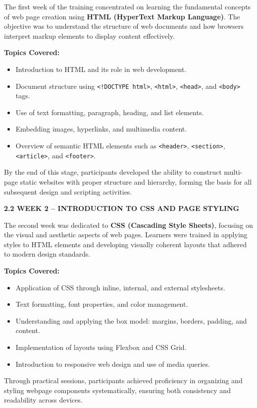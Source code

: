\documentclass[a4paper,12pt,oneside]{report}
\numberwithin{equation}{chapter}
\numberwithin{figure}{chapter}
\numberwithin{table}{chapter}
\begin{document}
The first week of the training concentrated on learning the fundamental concepts of web page creation using \textbf{HTML (HyperText Markup Language)}. The objective was to understand the structure of web documents and how browsers interpret markup elements to display content effectively.

\textbf{Topics Covered:}
\begin{itemize}
    \item Introduction to HTML and its role in web development.
    \item Document structure using \texttt{<!DOCTYPE html>}, \texttt{<html>}, \texttt{<head>}, and \texttt{<body>} tags.
    \item Use of text formatting, paragraph, heading, and list elements.
    \item Embedding images, hyperlinks, and multimedia content.
    \item Overview of semantic HTML elements such as \texttt{<header>}, \texttt{<section>}, \texttt{<article>}, and \texttt{<footer>}.
\end{itemize}

By the end of this stage, participants developed the ability to construct multi-page static websites with proper structure and hierarchy, forming the basis for all subsequent design and scripting activities.

\newpage
\noindent
\textbf{2.2 WEEK 2 – INTRODUCTION TO CSS AND PAGE STYLING}

The second week was dedicated to \textbf{CSS (Cascading Style Sheets)}, focusing on the visual and aesthetic aspects of web pages. Learners were trained in applying styles to HTML elements and developing visually coherent layouts that adhered to modern design standards.

\textbf{Topics Covered:}
\begin{itemize}
    \item Application of CSS through inline, internal, and external stylesheets.
    \item Text formatting, font properties, and color management.
    \item Understanding and applying the box model: margins, borders, padding, and content.
    \item Implementation of layouts using Flexbox and CSS Grid.
    \item Introduction to responsive web design and use of media queries.
\end{itemize}

Through practical sessions, participants achieved proficiency in organizing and styling webpage components systematically, ensuring both consistency and readability across devices.
\end{document}
